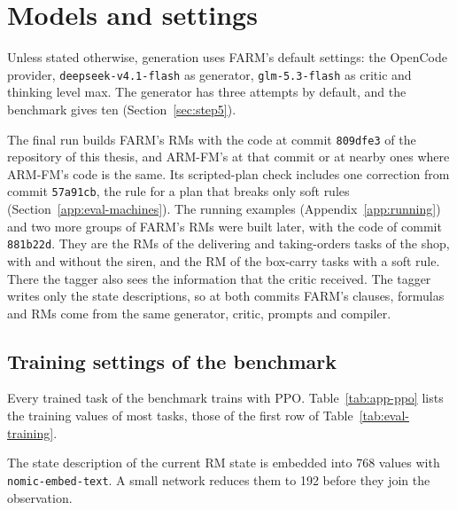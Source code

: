 \documentclass[11pt,english,listoffigures,listoftables]{tfgetsinf}
\begin{document}
\section{Models and settings}
\label{app:models-settings}
Unless stated otherwise, generation uses FARM's default settings: the OpenCode provider, \texttt{deepseek-v4.1-flash} as generator, \texttt{glm-5.3-flash} as critic and thinking level max. The generator has three attempts by default, and the benchmark gives ten (Section~\ref{sec:step5}).

The final run builds FARM's RMs with the code at commit \texttt{809dfe3} of the repository of this thesis, and ARM-FM's at that commit or at nearby ones where ARM-FM's code is the same. Its scripted-plan check includes one correction from commit \texttt{57a91cb}, the rule for a plan that breaks only soft rules (Section~\ref{app:eval-machines}). The running examples (Appendix~\ref{app:running}) and two more groups of FARM's RMs were built later, with the code of commit \texttt{881b22d}. They are the RMs of the delivering and taking-orders tasks of the shop, with and without the siren, and the RM of the box-carry tasks with a soft rule. There the tagger also sees the information that the critic received. The tagger writes only the state descriptions, so at both commits FARM's clauses, formulas and RMs come from the same generator, critic, prompts and compiler.

\subsection{Training settings of the benchmark}
\label{app:training-settings}
Every trained task of the benchmark trains with PPO. Table~\ref{tab:app-ppo} lists the training values of most tasks, those of the first row of Table~\ref{tab:eval-training}.

The state description of the current RM state is embedded into 768 values with \texttt{nomic-embed-text}. A small network reduces them to 192 before they join the observation.
\end{document}
